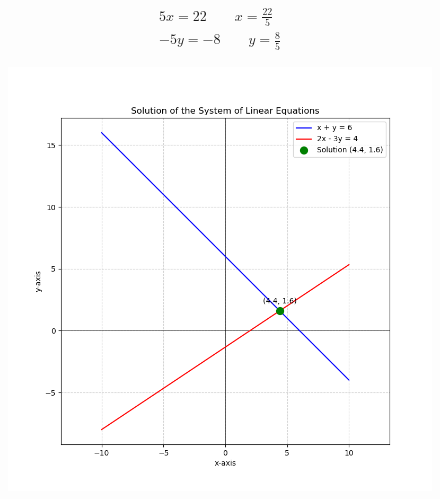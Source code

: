 \documentclass[journal]{IEEEtran}
\begin{document}
\begin{align}
    5x=22 \qquad x=\frac{22}{5}\\
    -5y=-8 \qquad y=\frac{8}{5}
\end{align}
\begin{figure}
    \centering
    \includegraphics[width=1\linewidth]{figs/plot.png}
    \caption{}
    \label{fig:placeholder}
\end{figure}
\end{document}
